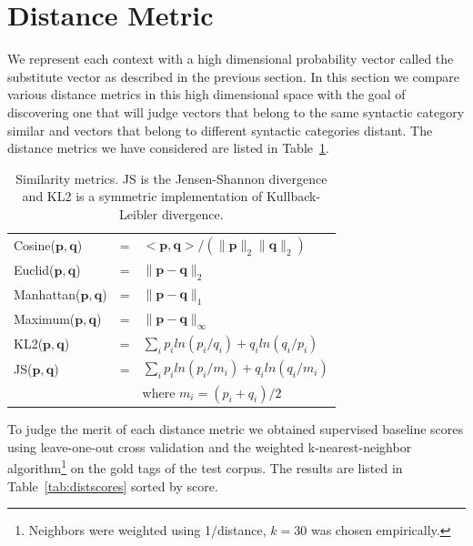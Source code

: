 \documentclass[11pt]{article}
\begin{document}
\section{Distance Metric}
\label{sec:dist}

We represent each context with a high dimensional probability vector
called the substitute vector as described in the previous section.  In
this section we compare various distance metrics in this high
dimensional space with the goal of discovering one that will judge
vectors that belong to the same syntactic category similar and vectors
that belong to different syntactic categories distant.  The distance
metrics we have considered are listed in Table~\ref{tab:metrics}.

\begin{table}[ht] \centering
\small
\begin{tabular}{|lll|}
\hline
Cosine($\mathbf{p}, \mathbf{q}$) & = & $<\mathbf{p},\mathbf{q}> / (\|\mathbf{p}\|_{2} \|\mathbf{q}\|_{2})$ \\
Euclid($\mathbf{p}, \mathbf{q}$) & = & $\|\mathbf{p} - \mathbf{q}\|_{2}$ \\
Manhattan($\mathbf{p}, \mathbf{q}$) & = & $\|\mathbf{p} - \mathbf{q}\|_{1}$ \\
Maximum($\mathbf{p}, \mathbf{q}$) & = & $\|\mathbf{p} - \mathbf{q}\|_{\infty}$ \\
KL2($\mathbf{p}, \mathbf{q}$) & = & $\sum_i p_iln(p_i/q_i) + q_iln(q_i/p_i) $\\
JS($\mathbf{p}, \mathbf{q}$) & = & $\sum_i p_iln(p_i/m_i) + q_iln(q_i/m_i) $\\
& & where $m_i = (p_i + q_i) / 2$\\
\hline
\end{tabular}
\caption{Similarity metrics.  JS is the Jensen-Shannon divergence and
  KL2 is a symmetric implementation of Kullback-Leibler divergence.}
\label{tab:metrics}
\end{table}

To judge the merit of each distance metric we obtained supervised
baseline scores using leave-one-out cross validation and the weighted
k-nearest-neighbor algorithm\footnote{Neighbors were weighted using
  1/distance, $k=30$ was chosen empirically.} on the gold tags of the
test corpus.  The results are listed in Table~\ref{tab:distscores}
sorted by score.  
\end{document}
